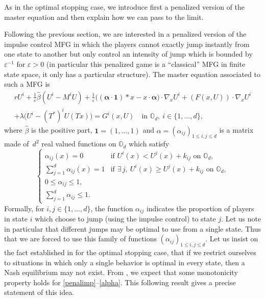 \documentclass[10pt]{amsart}
\newcommand{\One}{\mathbf{1}}
\let\epsilon\varepsilon
\theoremstyle{definition}
\begin{document}
As in the optimal stopping case, we introduce first a penalized version of the master equation and then explain how we can pass to the limit.

Following the previous section, we are interested in a penalized version of the impulse control MFG in which the players cannot exactly jump instantly from one state to another but only control an intensity of jump which is bounded by $\epsilon^{-1}$ for $\epsilon > 0$ (in particular this penalized game is a ``classical'' MFG in finite state space, it only has a particular structure). The master equation associated to such a MFG is
\begin{multline}\label{penalimp}
rU^i + \frac{1}{\epsilon} \hat{\beta} (U^i-M^iU) +\frac{1}{\epsilon}\bigl((\boldsymbol{\alpha}\cdot\One)* x-x\cdot \boldsymbol{\alpha} \bigr)\cdot \nabla_x U^i+ (F(x,U))\cdot \nabla_x U^i\\
+\lambda \bigl(U^i-(T^*)^i U(Tx)\bigr) = G^i(x,U) \quad\text{in } \mathbb{O}_d,\ i \in \{1,\dots,d\},
\end{multline}
where $\hat{\beta}$ is the positive part, $\One = (1,\dots,1)$ and $\alpha = (\alpha_{ij})_{1 \leq i,j\leq d}$ is a matrix made of~$d^2$ real valued functions on $\mathbb{O}_d$ which satisfy
\begin{equation}\label{alpha}
\begin{cases}
\alpha_{ij}(x) = 0 &\text{if } U^i(x) < U^j(x)+k_{ij} \text{ on } \mathbb{O}_d,\\
\sum_{j = 1}^d \alpha_{ij}(x) = 1 &\text{if } \exists\, j,\ U^i(x) \geq U^j(x)+k_{ij} \text{ on } \mathbb{O}_d,\\
0 \leq \alpha_{ij} \leq 1,\\
\sum_{j = 1}^d \alpha_{ij} \leq 1.
\end{cases}
\end{equation}
Formally, for $i, j \in \{1,\dots,d\}$, the function $\alpha_{ij}$ indicates the proportion of players in state $i$ which choose to jump (using the impulse control) to state $j$. Let us note in particular that different jumps may be optimal to use from a single state. Thus that we are forced to use this family of functions $(\alpha_{ij})_{1\leq i,j \leq d}$. Let us insist on the fact established in \cite{bertucci2018optimal} for the optimal stopping case, that if we restrict ourselves to situations in which only a single behavior is optimal in every state, then a Nash equilibrium may not exist. From \cite{bertucci2020fokker}, we expect that some monotonicity property holds for \eqref{penalimp}--\eqref{alpha}. This following result gives a precise statement of this idea.
\end{document}
